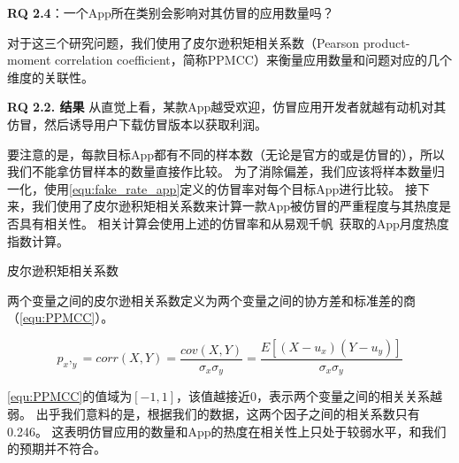 {\bf RQ 2.4}：一个App所在类别会影响对其仿冒的应用数量吗？

对于这三个研究问题，我们使用了皮尔逊积矩相关系数（Pearson product-moment correlation coefficient，简称PPMCC）来衡量应用数量和问题对应的几个维度的关联性。

{\bf RQ 2.2. 结果}
从直觉上看，某款App越受欢迎，仿冒应用开发者就越有动机对其仿冒，然后诱导用户下载仿冒版本以获取利润。

要注意的是，每款目标App都有不同的样本数（无论是官方的或是仿冒的），所以我们不能拿仿冒样本的数量直接作比较。
为了消除偏差，我们应该将样本数量归一化，使用\autoref{equ:fake_rate_app}定义的仿冒率对每个目标App进行比较。
接下来，我们使用了皮尔逊积矩相关系数来计算一款App被仿冒的严重程度与其热度是否具有相关性。
相关计算会使用上述的仿冒率和从易观千帆~\cite{yiguanqianfan}获取的App月度热度指数计算。

\begin{Def}
    皮尔逊积矩相关系数

    两个变量之间的皮尔逊相关系数定义为两个变量之间的协方差和标准差的商（\autoref{equ:PPMCC}）。
\end{Def}
\begin{equation}
    p_x,_y = corr(X,Y)=\frac{cov(X,Y)}{\sigma_x\sigma_y}=\frac{E[(X-u_x)(Y-u_y)]}{\sigma_x\sigma_y}
    \label{equ:PPMCC}
\end{equation}
\vspace{0.5mm}

\autoref{equ:PPMCC}的值域为$[-1, 1]$，该值越接近0，表示两个变量之间的相关关系越弱。
出乎我们意料的是，根据我们的数据，这两个因子之间的相关系数只有0.246。
这表明仿冒应用的数量和App的热度在相关性上只处于较弱水平，和我们的预期并不符合。

